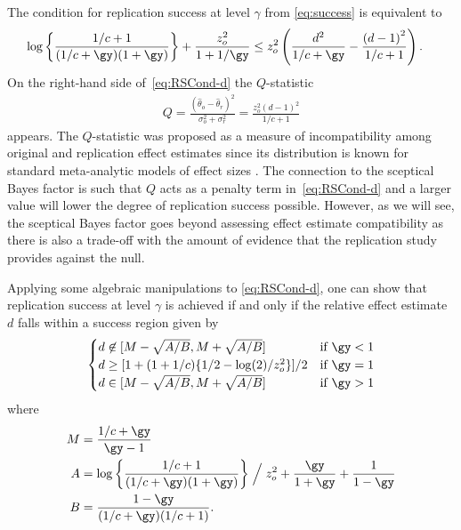 The condition for replication success at level $\gamma$ from \eqref{eq:success}
is equivalent to
\begin{align}
  \label{eq:RSCond-d}
  \log \left\{ \frac{1/c + 1}{(1/c + \gy)(1 + \gy)}\right\} +
  \frac{z_o^2}{1 + 1/\gy} &\leq z_o^2 \left(\frac{d^2}{1/c +
    \gy} - \frac{\left(d - 1\right)^2}{1/c + 1} \right).
\end{align}
On the right-hand side of~\eqref{eq:RSCond-d} the $Q$-statistic
\begin{align}
  \label{eq:Qstat}
  Q
  = \frac{(\hat{\theta}_o - \hat{\theta}_r)^2}{\sigma^2_o + \sigma^2_r}
  = \frac{z_o^2(d - 1)^2}{1/c + 1}
\end{align}
appears. The $Q$-statistic was proposed as a measure of incompatibility among
original and replication effect estimates since its distribution is known for
standard meta-analytic models of effect sizes \citep{Hedges2019}. The connection
to the sceptical Bayes factor is such that $Q$ acts as a penalty term
in~\eqref{eq:RSCond-d} and a larger value will lower the degree of replication
success possible. However, as we will see, the sceptical Bayes factor goes
beyond assessing effect estimate compatibility as there is also a trade-off with
the amount of evidence that the replication study provides against the null.

Applying some algebraic manipulations to \eqref{eq:RSCond-d}, one can show that
replication success at level $\gamma$ is achieved if and only if the relative
effect estimate $d$ falls within a success region given by
\begin{align}
  \label{eq:dsuccess}
  \begin{cases}
    d \not\in [M - \sqrt{A/B}, M + \sqrt{A/B}] & \text{if} ~ \gy < 1 \\
    d \geq [1 + (1 + 1/c)\{1/2 - \log(2)/z_o^2\}]/2
    & \text{if} ~ \gy = 1 \\
   d \in [M - \sqrt{A/B}, M + \sqrt{A/B}] & \text{if} ~ \gy > 1\\
  \end{cases}
\end{align}
where
\begin{align*}
  M &= \frac{1/c + \gy}{\gy - 1} \\
  A &= \log \left\{ \frac{1/c + 1}{(1/c + \gy)(1 + \gy)}\right\}\Bigm/ z_o^2 +
  \frac{\gy}{1 + \gy} + \frac{1}{1 - \gy} \\
  B &= \frac{1 - \gy}{(1/c + \gy)(1/c + 1)}.
\end{align*}

